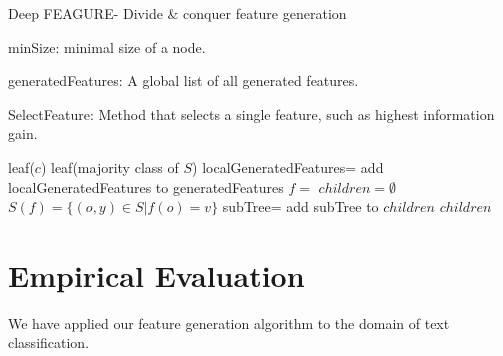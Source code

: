 \documentclass[twoside,11pt]{article}
\theoremstyle{definition}
\begin{document}
\begin{algorithm}[H]
	\caption{Deep FEAGURE- Divide \& conquer feature generation}
	\label{code-tree-thing}
	\small
	minSize: minimal size of a node.
	
	generatedFeatures: A global list of all generated features.
	
	SelectFeature: Method that selects a single feature, such as highest information gain.
	
	\begin{algorithmic}
		\State 
		\Return leaf($c$)
		\EndIf
		\State 
		\Return leaf(majority class of $S$)
		\EndIf
		\State localGeneratedFeatures=
		\State add localGeneratedFeatures to generatedFeatures
		\State $f=$ 
		\State $children=\emptyset$
			\State $S(f)=\{(o,y)\in S|f(o)=v\}$
			\State subTree= 
			\State add subTree to $children$
		\EndFor
		\State \Return $children$
		\EndFunction
		
	\end{algorithmic}
\end{algorithm}




\section{Empirical Evaluation}
We have applied our feature generation algorithm to the domain of text classification. %
\end{document}
